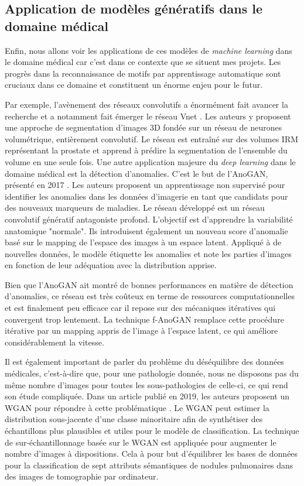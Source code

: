 \documentclass[12pt, oneside, a4paper, titlepage]{article}
\begin{document}
\subsection{Application de modèles génératifs dans le domaine médical}

 
Enfin, nous allons voir les applications de ces modèles de \textit{machine learning} dans le domaine médical car c'est dans ce contexte que se situent mes projets. Les progrès dans la reconnaissance de motifs par apprentissage automatique sont cruciaux dans ce domaine et constituent un énorme enjeu pour le futur. 

Par exemple, l'avènement des réseaux convolutifs a énormément fait avancer la recherche et a notamment fait émerger le réseau Vnet \cite{milletari_v-net_2016}. Les auteurs y proposent une approche de
segmentation d'images 3D fondée sur un réseau de neurones volumétrique, entièrement convolutif. Le réseau est entraîné sur des volumes IRM représentant la prostate et apprend à prédire la segmentation de l'ensemble du volume en une seule fois. 
Une autre application majeure du \textit{deep learning} dans le domaine médical est la détection d'anomalies. C'est le but de l'AnoGAN, présenté en 2017 \cite{schlegl_unsupervised_2017}. Les auteurs proposent un apprentissage non supervisé pour identifier les anomalies dans les données d'imagerie en tant que candidats pour des nouveaux marqueurs de maladies. Le réseau développé est un réseau convolutif génératif antagoniste profond. L'objectif est d'apprendre la variabilité anatomique "normale". Ils introduisent également un nouveau score d'anomalie basé sur le mapping de l'espace des images à un espace latent. Appliqué à de nouvelles données, le modèle étiquette les anomalies et note les parties d'images en fonction de leur adéquation avec la distribution apprise. 

Bien que l'AnoGAN ait montré de bonnes performances en matière de détection d'anomalies, ce réseau est très coûteux en terme de ressources computationnelles et est finalement peu efficace car il repose sur des mécaniques itératives qui convergent trop lentement. La technique f-AnoGAN \cite{schlegl_f-anogan_2019} remplace cette procédure itérative par un mapping appris de l'image à l'espace latent, ce qui améliore considérablement la vitesse. 

Il est également important de parler du problème du déséquilibre des données médicales, c'est-à-dire que, pour une pathologie donnée, nous ne disposons pas du même nombre d'images pour toutes les sous-pathologies de celle-ci, ce qui rend son étude compliquée. Dans un article publié en 2019, les auteurs proposent un WGAN pour répondre à cette problématique \cite{wang_wgan-based_2019}. Le WGAN peut estimer la distribution sous-jacente d'une classe minoritaire afin de synthétiser des échantillons plus plausibles et utiles pour le modèle de classification. La technique de sur-échantillonnage basée sur le WGAN est appliquée pour augmenter le nombre d'images à dispositions. Cela à pour but d'équilibrer les bases de données pour la classification de sept attributs sémantiques de nodules pulmonaires dans des images de tomographie par ordinateur. 
\end{document}

